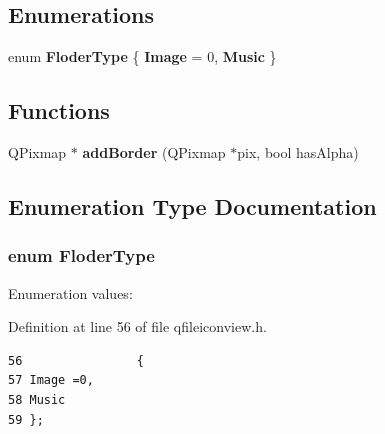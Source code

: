 \subsection*{Enumerations}
\begin{CompactItemize}
\item 
enum {\bf Floder\-Type} \{ {\bf Image} = 0, 
{\bf Music}
 \}
\end{CompactItemize}
\subsection*{Functions}
\begin{CompactItemize}
\item 
QPixmap $\ast$ {\bf add\-Border} (QPixmap $\ast$pix, bool has\-Alpha)
\end{CompactItemize}


\subsection{Enumeration Type Documentation}
\subsubsection{\setlength{\rightskip}{0pt plus 5cm}enum {\bf Floder\-Type}}\label{qfileiconview_8h_a3}


\begin{Desc}
\item[Enumeration values: ]\par
\begin{description}
\item[{\em 
Image\label{qfileiconview_8h_a3a0}
}]\item[{\em 
Music\label{qfileiconview_8h_a3a1}
}]\end{description}
\end{Desc}



Definition at line 56 of file qfileiconview.h.



\footnotesize\begin{verbatim}56                {
57 Image =0,
58 Music
59 };
\end{verbatim}\normalsize 


